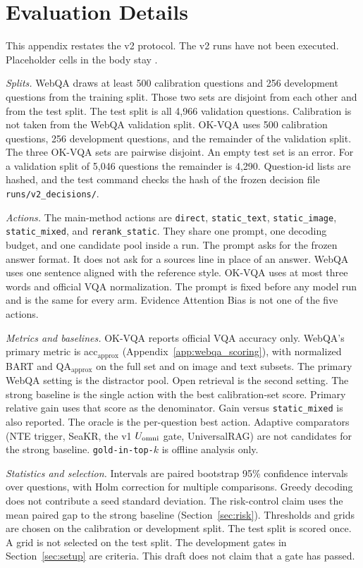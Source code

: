 \section{Evaluation Details}
\label{app:protocol}
This appendix restates the v2 protocol.
The v2 runs have not been executed.
Placeholder cells in the body stay \ph{}.

\textit{Splits.}
WebQA draws at least 500 calibration questions and 256 development questions from the training split.
Those two sets are disjoint from each other and from the test split.
The test split is all 4{,}966 validation questions.
Calibration is not taken from the WebQA validation split.
OK-VQA uses 500 calibration questions, 256 development questions, and the remainder of the validation split.
The three OK-VQA sets are pairwise disjoint.
An empty test set is an error.
For a validation split of 5{,}046 questions the remainder is 4{,}290.
Question-id lists are hashed, and the test command checks the hash of the frozen decision file \texttt{runs/v2\_decisions/}.

\textit{Actions.}
The main-method actions are \texttt{direct}, \texttt{static\_text}, \texttt{static\_image}, \texttt{static\_mixed}, and \texttt{rerank\_static}.
They share one prompt, one decoding budget, and one candidate pool inside a run.
The prompt asks for the frozen answer format.
It does not ask for a sources line in place of an answer.
WebQA uses one sentence aligned with the reference style.
OK-VQA uses at most three words and official VQA normalization.
The prompt is fixed before any model run and is the same for every arm.
Evidence Attention Bias is not one of the five actions.

\textit{Metrics and baselines.}
OK-VQA reports official VQA accuracy only.
WebQA's primary metric is acc$_{\mathrm{approx}}$ (Appendix~\ref{app:webqa_scoring}), with normalized BART and QA$_{\mathrm{approx}}$ on the full set and on image and text subsets.
The primary WebQA setting is the distractor pool.
Open retrieval is the second setting.
The strong baseline is the single action with the best calibration-set score.
Primary relative gain uses that score as the denominator.
Gain versus \texttt{static\_mixed} is also reported.
The oracle is the per-question best action.
Adaptive comparators (NTE trigger, SeaKR, the v1 $U_{\mathrm{omni}}$ gate, UniversalRAG) are not candidates for the strong baseline.
\texttt{gold-in-top-$k$} is offline analysis only.

\textit{Statistics and selection.}
Intervals are paired bootstrap 95\% confidence intervals over questions, with Holm correction for multiple comparisons.
Greedy decoding does not contribute a seed standard deviation.
The risk-control claim uses the mean paired gap to the strong baseline (Section~\ref{sec:risk}).
Thresholds and grids are chosen on the calibration or development split.
The test split is scored once.
A grid is not selected on the test split.
The development gates in Section~\ref{sec:setup} are criteria.
This draft does not claim that a gate has passed.

